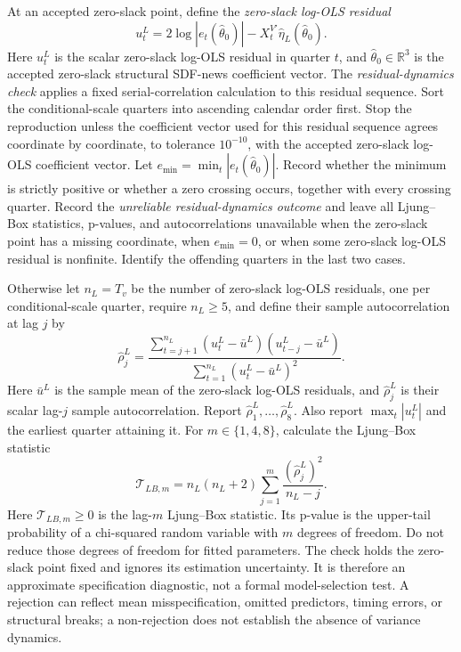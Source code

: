 \documentclass[11pt]{article}
\begin{document}
At an accepted zero-slack point, define the \emph{zero-slack log-OLS residual}
\begin{equation*}
 u_t^L=2\log|e_t(\widehat\theta_0)|-X_t^{V\prime}\widehat\eta_L(\widehat\theta_0).
\end{equation*}
Here \(u_t^L\) is the scalar zero-slack log-OLS residual in quarter \(t\), and
\(\widehat\theta_0\in\mathbb R^3\) is the accepted zero-slack structural SDF-news coefficient
vector. The \emph{residual-dynamics check} applies a fixed serial-correlation calculation to this
residual sequence. Sort the conditional-scale quarters into ascending calendar order first. Stop the
reproduction unless the coefficient vector used for this residual sequence agrees coordinate by
coordinate, to tolerance \(10^{-10}\), with the accepted zero-slack log-OLS coefficient vector. Let
\(e_{\min}=\min_t|e_t(\widehat\theta_0)|\). Record whether the minimum is strictly positive or
whether a zero crossing occurs, together with every crossing quarter. Record the
\emph{unreliable residual-dynamics outcome} and leave all Ljung--Box statistics, p-values, and
autocorrelations unavailable when the zero-slack point has a missing coordinate, when
\(e_{\min}=0\), or when some zero-slack log-OLS residual is nonfinite. Identify the offending quarters in the
last two cases.

Otherwise let \(n_L=T_v\) be the
number of zero-slack log-OLS residuals, one per conditional-scale quarter, require \(n_L\ge5\), and
define their sample
autocorrelation at lag \(j\) by
\begin{equation*}
 \widehat\rho_j^L=
 \frac{\sum_{t=j+1}^{n_L}(u_t^L-\bar u^L)(u_{t-j}^L-\bar u^L)}
      {\sum_{t=1}^{n_L}(u_t^L-\bar u^L)^2}.
\end{equation*}
Here \(\bar u^L\) is the sample mean of the zero-slack log-OLS residuals, and
\(\widehat\rho_j^L\) is their scalar lag-\(j\) sample autocorrelation. Report
\(\widehat\rho_1^L,\ldots,\widehat\rho_8^L\). Also report
\(\max_t|u_t^L|\) and the earliest quarter attaining it. For
\(m\in\{1,4,8\}\), calculate the Ljung--Box statistic
\begin{equation*}
 \mathcal T_{LB,m}=n_L(n_L+2)\sum_{j=1}^{m}\frac{(\widehat\rho_j^L)^2}{n_L-j}.
\end{equation*}
Here \(\mathcal T_{LB,m}\ge0\) is the lag-\(m\) Ljung--Box statistic. Its p-value is the upper-tail
probability of a chi-squared random variable with \(m\) degrees of freedom. Do not reduce those
degrees of freedom for fitted parameters. The check holds the zero-slack point fixed and ignores its
estimation uncertainty. It is therefore an approximate specification diagnostic, not a formal
model-selection test. A rejection can reflect mean misspecification, omitted predictors, timing
errors, or structural breaks; a non-rejection does not establish the absence of variance dynamics.
\end{document}
